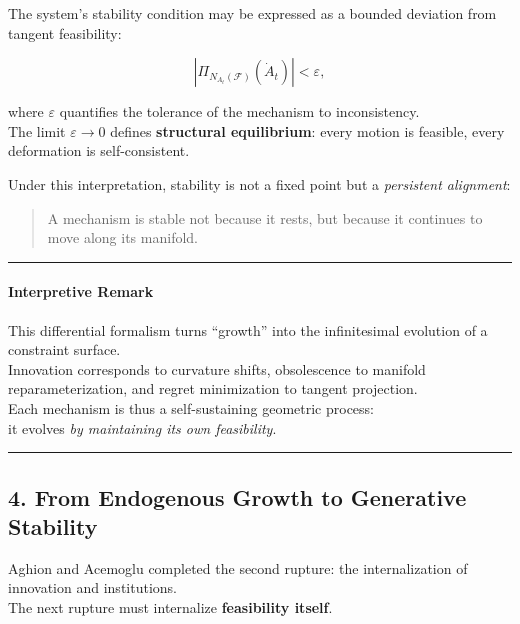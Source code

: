 \documentclass[11pt]{article}
\begin{document}
The system's stability condition may be expressed as a bounded deviation
from tangent feasibility:

\[
|\Pi_{N_{A_t}(\mathcal{F})}(\dot{A}_t)| < \varepsilon,
\]

where \(\varepsilon\) quantifies the tolerance of the mechanism to
inconsistency.\\
The limit \(\varepsilon \to 0\) defines \textbf{structural equilibrium}:
every motion is feasible, every deformation is self-consistent.

Under this interpretation, stability is not a fixed point but a
\emph{persistent alignment}:

\begin{quote}
A mechanism is stable not because it rests, but because it continues to
move along its manifold.
\end{quote}

\begin{center}\rule{0.5\linewidth}{0.5pt}\end{center}

\paragraph{\texorpdfstring{\textbf{Interpretive
Remark}}{Interpretive Remark}}\label{interpretive-remark}

This differential formalism turns ``growth'' into the infinitesimal
evolution of a constraint surface.\\
Innovation corresponds to curvature shifts, obsolescence to manifold
reparameterization, and regret minimization to tangent projection.\\
Each mechanism is thus a self-sustaining geometric process:\\
it evolves \emph{by maintaining its own feasibility}.

\begin{center}\rule{0.5\linewidth}{0.5pt}\end{center}

\subsection{4. From Endogenous Growth to Generative
Stability}\label{from-endogenous-growth-to-generative-stability}

Aghion and Acemoglu completed the second rupture: the internalization of
innovation and institutions.\\
The next rupture must internalize \textbf{feasibility itself}.
\end{document}
